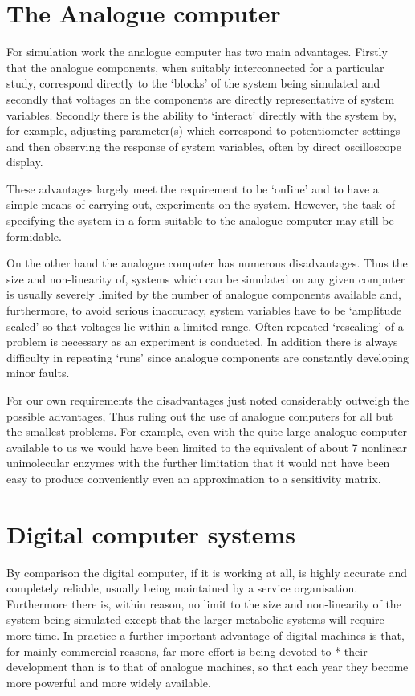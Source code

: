 \section{The Analogue computer}

For simulation work the analogue computer has two main advantages. Firstly that the analogue components, when suitably interconnected for a particular study, correspond directly to the `blocks' of the system being simulated and secondly that voltages on the components are directly representative of system variables. Secondly there is the ability to `interact' directly with the system by, for example, adjusting parameter(s) which correspond to potentiometer settings and then observing the response of system variables, often by direct oscilloscope display.

These advantages largely meet the requirement to be `onIine' and to have a simple means of carrying out, experiments on the system. However, the task of specifying the system in a form suitable to the analogue computer may still be formidable.

On the other hand the analogue computer has numerous disadvantages. Thus the size and non-linearity of, systems which can be simulated on any given computer is usually severely limited by the number of analogue components available and, furthermore, to avoid serious inaccuracy, system variables have to be `amplitude scaled' so that voltages lie within a limited range. Often repeated `rescaling' of a problem is necessary as an experiment is conducted. In addition there is always difficulty in repeating `runs' since analogue components are constantly developing minor faults.

For our own requirements the disadvantages just noted considerably outweigh the possible advantages, Thus ruling out the use of analogue computers for all but the smallest problems. For example, even with the quite large analogue computer available to us we would have been limited to the equivalent of about 7 nonlinear unimolecular enzymes with the further limitation that it would not have been easy to produce conveniently even an approximation to a sensitivity matrix.

\section{Digital computer systems}

By comparison the digital computer, if it is working at all, is highly accurate and completely reliable, usually being maintained by a service organisation. Furthermore there is, within reason, no limit to the size and non-linearity of the system being simulated except that the larger metabolic systems will require more time. In practice a further important advantage of digital machines is that, for mainly commercial reasons, far more effort is being devoted to * their development than is to that of analogue machines, so that each year they become more powerful and more widely available.

